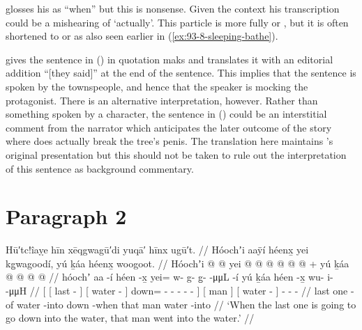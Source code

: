 \citeauthor{swanton:1909} glosses his  as “when” but this is nonsense.
Given the context his transcription could be a mishearing of  ‘actually’.
This particle is more fully  or  \parencite[74]{leer:1978b}, but it is often shortened to  or  as also seen earlier in (\ref{ex:93-8-sleeping-bathe}).

\citeauthor{swanton:1909} gives the sentence in (\lastx) in quotation maks and translates it with an editorial addition “[they said]” at the end of the sentence.
This implies that the sentence is spoken by the townspeople, and hence that the speaker is mocking the protagonist.
There is an alternative interpretation, however.
Rather than something spoken by a character, the sentence in (\lastx) could be an interstitial comment from the narrator which anticipates the later outcome of the story where  does actually break the tree’s penis.
The translation here maintains \citeauthor{swanton:1909}’s original presentation but this should not be taken to rule out the interpretation of this sentence as background commentary.

\section{Paragraph 2}\label{sec:093-para-2}

\ex\label{ex:93-19-into-the-water}%
%
\begingl
	\glpreamble	Hū′tc!îaỵe hīn xēqgwagū′di yuqā′ hīnx ugū′t. //
	\glpreamble	Hóochʼi aaÿí héenx̱ yei kg̱wagoodí, yú ḵáa héenx̱ woogoot. //
	\gla	{} {} Hóochʼi  @ {} {}
			{}  @ {} {}
			yei @  @ {} @ {} @ {} @ {} @ {} {} +
		{} yú ḵáa {}
		{}  @ {} {}
		 @ {} @ {} @ {} //
	\glb	{} {} hóochʼ aa -í {}
			{} héen -x̱ {}
			yei= w- g- g̱-  -μμL -í {}
		{} yú ḵáa {}
		{} héen -x̱ {}
		wu- i-  -μμH //
	\glc	{}[ {}[ last  - {}]
			{}[ water - {}]
			down= - - -  - - {}]
		{}[  man {}]
		{}[ water - {}]
		- -  - //
	\gld	{} {} last one -of {}
			{} water -into {}
			down  {} {} {} {} -when {}
		{} that man {}
		{} water -into {}
		 {} {} {} //
	\glft	‘When the last one is going to go down into the water, that man went into the water.’
		//
\endgl
\xe

